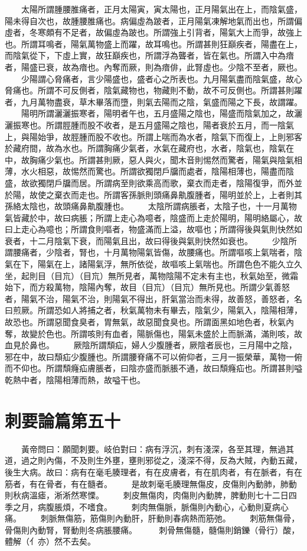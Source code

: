 　　太陽所謂腫腰脽痛者，正月太陽寅，寅太陽也，正月陽氣出在上，而陰氣盛，陽未得自次也，故腫腰脽痛也。病偏虛為跛者，正月陽氣凍解地氣而出也，所謂偏虛者，冬寒頗有不足者，故偏虛為跛也。所謂強上引背者，陽氣大上而爭，故強上也。所謂耳鳴者，陽氣萬物盛上而躍，故耳鳴也。所謂甚則狂巔疾者，陽盡在上，而陰氣從下，下虛上實，故狂巔疾也，所謂浮為聾者，皆在氣也。所謂入中為瘖者，陽盛已衰，故為瘖也。內奪而厥，則為瘖俳，此腎虛也。少陰不至者，厥也。
　　少陽謂心脅痛者，言少陽盛也，盛者心之所表也。九月陽氣盡而陰氣盛，故心脅痛也。所謂不可反側者，陰氣藏物也，物藏則不動，故不可反側也。所謂甚則躍者，九月萬物盡衰，草木畢落而墮，則氣去陽而之陰，氣盛而陽之下長，故謂躍。
　　陽明所謂灑灑振寒者，陽明者午也，五月盛陽之陰也，陽盛而陰氣加之，故灑灑振寒也。所謂脛腫而股不收者，是五月盛陽之陰也，陽者衰於五月，而一陰氣上，與陽始爭，故脛腫而股不收也。所謂上喘而為水者，陰氣下而復上，上則邪客於藏府間，故為水也。所謂胸痛少氣者，水氣在藏府也，水者，陰氣也，陰氣在中，故胸痛少氣也。所謂甚則厥，惡人與火，聞木音則惕然而驚者，陽氣與陰氣相薄，水火相惡，故惕然而驚也。所謂欲獨閉戶牖而處者，陰陽相薄也，陽盡而陰盛，故欲獨閉戶牖而居。所謂病至則欲乘高而歌，棄衣而走者，陰陽復爭，而外並於陽，故使之棄衣而走也。所謂客孫脈則頭痛鼻鼽腹腫者，陽明並於上，上者則其孫絡太陰也，故頭痛鼻鼽腹腫也。
　　太陰所謂病脹者，太陰子也，十一月萬物氣皆藏於中，故曰病脹；所謂上走心為噫者，陰盛而上走於陽明，陽明絡屬心，故曰上走心為噫也；所謂食則嘔者，物盛滿而上溢，故嘔也；所謂得後與氣則快然如衰者，十二月陰氣下衰，而陽氣且出，故曰得後與氣則快然如衰也。
　　少陰所謂腰痛者，少陰者，腎也，十月萬物陽氣皆傷，故腰痛也。所謂嘔咳上氣喘者，陰氣在下，陽氣在上，諸陽氣浮，無所依從，故嘔咳上氣喘也。所謂色色不能久立久坐，起則目（目巟）（目巟）無所見者，萬物陰陽不定未有主也，秋氣始至，微霜始下，而方殺萬物，陰陽內奪，故目（目巟）（目巟）無所見也。所謂少氣善怒者，陽氣不治，陽氣不治，則陽氣不得出，肝氣當治而未得，故善怒，善怒者，名曰煎厥。所謂恐如人將捕之者，秋氣萬物未有畢去，陰氣少，陽氣入，陰陽相薄，故恐也。所謂惡聞食臭者，胃無氣，故惡聞食臭也。所謂面黑如地色者，秋氣內奪，故變於色也。所謂咳則有血者，陽脈傷也，陽氣未盛於上而脈滿，滿則咳，故血見於鼻也。
　　厥陰所謂頹疝，婦人少腹腫者，厥陰者辰也，三月陽中之陰，邪在中，故曰頹疝少腹腫也。所謂腰脊痛不可以俯仰者，三月一振榮華，萬物一俯而不仰也。所謂頹癃疝膚脹者，曰陰亦盛而脈脹不通，故曰頹癃疝也。所謂甚則嗌乾熱中者，陰陽相薄而熱，故嗌干也。


\section{刺要論篇第五十}

　　黃帝問曰：願聞刺要。岐伯對曰：病有浮沉，刺有淺深，各至其理，無過其道，過之則內傷，不及則生外壅，壅則邪從之，淺深不得，反為大賊，內動五藏，後生大病。故曰：病有在毫毛腠理者，有在皮膚者，有在肌肉者，有在脈者，有在筋者，有在骨者，有在髓者。
　　是故刺毫毛腠理無傷皮，皮傷則內動肺，肺動則秋病溫瘧，淅淅然寒慄。
　　刺皮無傷肉，肉傷則內動脾，脾動則七十二日四季之月，病腹脹煩，不嗜食。
　　刺肉無傷脈，脈傷則內動心，心動則夏病心痛。
　　刺脈無傷筋，筋傷則內動肝，肝動則春病熱而筋弛。
　　刺筋無傷骨，骨傷則內動腎，腎動則冬病脹腰痛。
　　 刺骨無傷髓，髓傷則銷鑠（骨行）酸，體解（亻亦）然不去矣。


